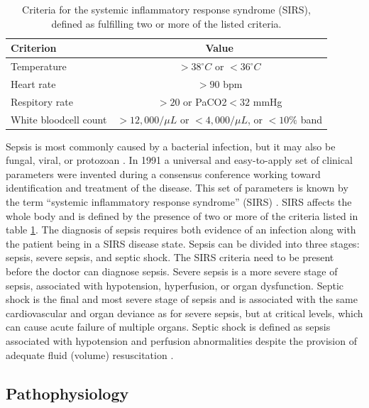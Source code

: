 \begin{table}[t!]
  \begin{center}
    \caption{Criteria for the systemic inflammatory response syndrome (SIRS), defined as fulfilling two or more of the listed criteria. \cite{RN4}}
    \label{tab:SIRS}
    \begin{tabular}{l|c} %
      \textbf{Criterion} & \textbf{Value} \\
      \hline
      Temperature & $>38^\circ C$ or $<36^\circ C$\\
      Heart rate & $>90$ bpm \\ 
      Respitory rate & $>20$ or PaCO2$<32$ mmHg \\
      White bloodcell count & $>12,000/\mu L$ or $<4,000/\mu L$, or $<10\%$ band 
    \end{tabular}
  \end{center}
\end{table}

Sepsis is most commonly caused by a bacterial infection, but it may also be fungal, viral, or protozoan \cite{RN2}. In 1991 a universal and easy-to-apply set of clinical parameters were invented during a consensus conference working toward identification and treatment of the disease. This set of parameters is known by the term “systemic inflammatory response syndrome” (SIRS) \cite{RN6}. SIRS affects the whole body and is defined by the presence of two or more of the criteria listed in table \ref{tab:SIRS}. The diagnosis of sepsis requires both evidence of an infection along with the patient being in a SIRS disease state. Sepsis can be divided into three stages: sepsis, severe sepsis, and septic shock. The SIRS criteria need to be present before the doctor can diagnose sepsis. Severe sepsis is a more severe stage of sepsis, associated with hypotension, hyperfusion, or organ dysfunction.\cite{RN8} Septic shock is the final and most severe stage of sepsis and is associated with the same cardiovascular and organ deviance as for severe sepsis, but at critical levels, which can cause acute failure of multiple organs. Septic shock is defined as sepsis associated with hypotension and perfusion abnormalities despite the provision of adequate fluid (volume) resuscitation \cite{RN8}. 


\subsection{Pathophysiology}\label{sect:pathophysiology}

